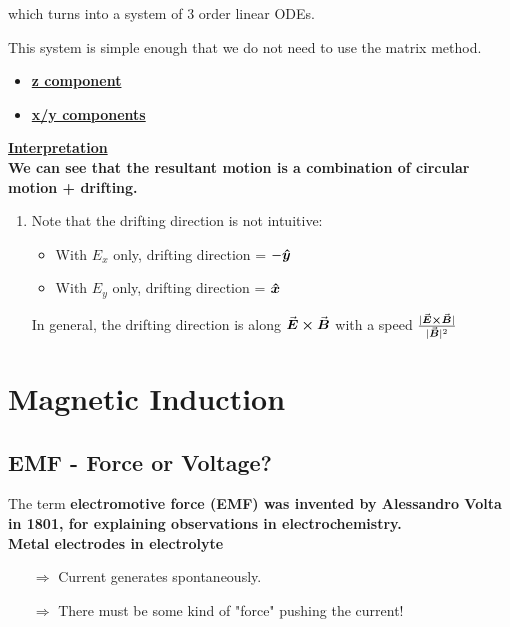 \documentclass[class=article, crop=false, 12pt]{standalone}
\begin{document}
which turns into a system of 3  order linear ODEs.

This system is simple enough that we do not need to use the matrix method.
\begin{itemize}
    \item \bf{\ul{z component}}
    \item \bf{\ul{x/y components}}
\end{itemize}

\bf{\ul{Interpretation}}\\
We can see that the resultant motion is a combination of circular motion + drifting.
\begin{enumerate}
    \item Note that the drifting direction is not intuitive: 
    \begin{itemize}
        \item With $E_x$ only, drifting direction = $-\vu*{y}$
        \item With $E_y$ only, drifting direction = $\vu*{x}$
    \end{itemize}
    In general, the drifting direction is along $\va*{E}\cross\va*{B}$ with a speed $\frac{|\va*{E}\cross\va*{B}|}{|\va*{B}|^2}$
\end{enumerate}



\linesep
\section{Magnetic Induction}


\subsection{EMF - Force or Voltage?}

The term \bf{electromotive force} (EMF) was invented by Alessandro Volta in 1801,
for explaining observations in electrochemistry.\\

Metal electrodes in electrolyte 
\begin{itemize}
    \item[$\Rightarrow$] Current generates spontaneously.
    \item[$\Rightarrow$] There must be some kind of "force" pushing the current! 
\end{itemize}
\end{document}
